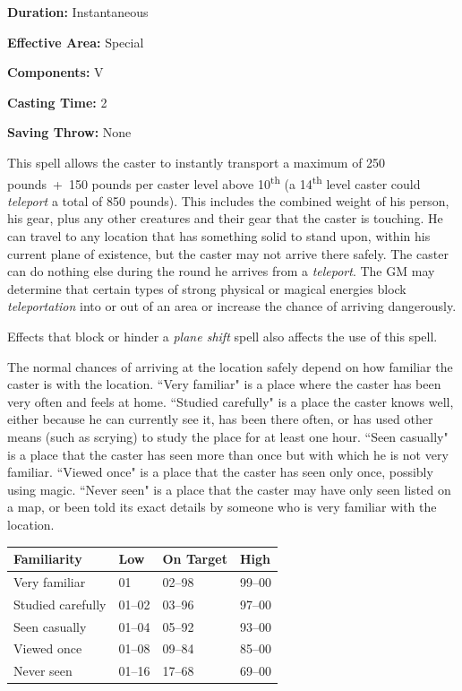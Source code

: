 \begin{multicols}{2}
\begin{minipage}{\columnwidth}
\noindent \textbf{Duration:} Instantaneous

\noindent \textbf{Effective Area:} Special

\noindent \textbf{Components:} V

\noindent \textbf{Casting Time:} 2

\noindent \textbf{Saving Throw:} None

\end{minipage}

This spell allows the caster to instantly transport a maximum of 250 pounds~+~150 pounds per caster level above 10\textsuperscript{th} (a 14\textsuperscript{th} level caster could \textit{teleport} a total of 850 pounds).  This includes the combined weight of his person, his gear, plus any other creatures and their gear that the caster is touching.  He can travel to any location that has something solid to stand upon, within his current plane of existence, but the caster may not arrive there safely.  The caster can do nothing else during the round he arrives from a \textit{teleport}.  The GM may determine that certain types of strong physical or magical energies block \textit{teleportation} into or out of an area or increase the chance of arriving dangerously.

Effects that block or hinder a \textit{plane shift} spell also affects the use of this spell.

The normal chances of arriving at the location safely depend on how familiar the caster is with the location.  ``Very familiar" is a place where the caster has been very often and feels at home.  ``Studied carefully" is a place the caster knows well, either because he can currently see it, has been there often, or has used other means (such as scrying) to study the place for at least one hour.  ``Seen casually" is a place that the caster has seen more than once but with which he is not very familiar.  ``Viewed once" is a place that the caster has seen only once, possibly using magic.  ``Never seen" is a place that the caster may have only seen listed on a map, or been told its exact details by someone who is very familiar with the location.

\noindent
\begin{tabular}{|p{}|p{}|p{}|p{}|}
\hline
Familiarity	& Low	& On Target	& High \\
\hline\hline
\rowcolor[gray]{.9}Very familiar	& 01	& 02--98	& 99--00 \\
Studied carefully	& 01--02	& 03--96	& 97--00 \\
\rowcolor[gray]{.9}Seen casually	& 01--04	& 05--92	& 93--00 \\
Viewed once	& 01--08	& 09--84	& 85--00 \\
\rowcolor[gray]{.9}Never seen	& 01--16	& 17--68	& 69--00 \\
\hline
\end{tabular}


\end{multicols}
